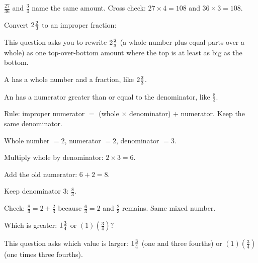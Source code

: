 
$\tfrac{27}{36}$ and $\tfrac{3}{4}$ name the same amount. Cross check: $27 \times 4 = 108$ and $36 \times 3 = 108$.


Convert $2\tfrac{2}{3}$ to an improper fraction:\ \blank[2.4cm]


This question asks you to rewrite $2\tfrac{2}{3}$ (a whole number plus equal parts over a whole) as one top-over-bottom amount where the top is at least as big as the bottom.

\begin{words}
  \item A has a whole number and a fraction, like $2\tfrac{2}{3}$.
  \item An has a numerator greater than or equal to the denominator, like $\tfrac{8}{3}$.
  \item Rule: improper numerator $= $ (whole $\times$ denominator) $+$ numerator. Keep the same denominator.
\end{words}

\begin{steps}
  \item Whole number $= 2$, numerator $= 2$, denominator $= 3$.
  \item Multiply whole by denominator: $2 \times 3 = 6$.
  \item Add the old numerator: $6 + 2 = 8$.
  \item Keep denominator 3: $\tfrac{8}{3}$.
\end{steps}


Check: $\tfrac{8}{3} = 2 + \tfrac{2}{3}$ because $\tfrac{6}{3} = 2$ and $\tfrac{2}{3}$ remains. Same mixed number.


Which is greater: $1\tfrac{3}{4}$ or $(1)\!\left(\tfrac{3}{4}\right)$?\ \blank[2.4cm]


This question asks which value is larger: $1\tfrac{3}{4}$ (one and three fourths) or $(1)\!\left(\tfrac{3}{4}\right)$ (one times three fourths).


